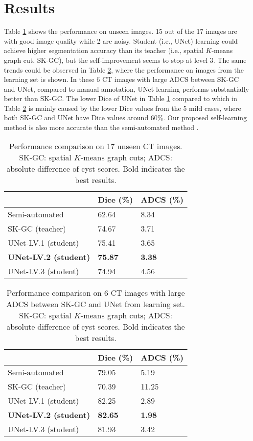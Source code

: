 \documentclass{article}
\begin{document}
\section{Results}
Table \ref{17slices} shows the performance on unseen images. 15 out of the 17 images are with good image quality while 2 are noisy. Student (i.e., UNet) learning could achieve higher segmentation accuracy than its teacher (i.e., spatial $K$-means graph cut, SK-GC), but the self-improvement seems to stop at level 3.  
The same trends could be observed in Table \ref{6slices}, where the performance on images from the learning set is shown. In these 6 CT images with large ADCS between SK-GC and UNet, compared to manual annotation, UNet learning performs substantially better than SK-GC. The lower Dice of UNet in Table \ref{17slices} compared to which in Table \ref{6slices} is mainly caused by the lower Dice values from the 5 mild cases, where both SK-GC and UNet have Dice values around 60\%. Our proposed self-learning method is also more accurate than the semi-automated method \cite{yao2014sustained}.

\begin{table}[!t] 
\centering
\caption{Performance comparison on 17 unseen CT images. SK-GC: spatial $K$-means graph cuts; ADCS: absolute difference of cyst scores. Bold indicates the best results.
}
\label{17slices}
\begin{tabular}{p{3cm}p{2.2cm}p{2.2cm}}
\hline
 & Dice (\%) & ADCS (\%)\\
\hline
Semi-automated \cite{yao2014sustained} & 62.64 & 8.34 \\
SK-GC (teacher) & 74.67 & 3.71 \\
UNet-LV.1 (student) & 75.41 & 3.65 \\
\textbf{UNet-LV.2 (student)} & \textbf{75.87} & \textbf{3.38} \\
UNet-LV.3 (student) & 74.94 & 4.56 \\
\hline
\end{tabular}
\end{table}


\begin{table}[!t] 
\centering
\caption{Performance comparison on 6 CT images with large ADCS between SK-GC and UNet from learning set. SK-GC: spatial $K$-means graph cuts; ADCS: absolute difference of cyst scores. Bold indicates the best results.
}
\label{6slices}
\begin{tabular}{p{3cm}p{2.2cm}p{2.2cm}}
\hline
 & Dice (\%) & ADCS (\%)\\
\hline
Semi-automated \cite{yao2014sustained} & 79.05 & 5.19 \\
SK-GC (teacher) & 70.39 & 11.25 \\
UNet-LV.1 (student) & 82.25 & 2.89 \\
\textbf{UNet-LV.2 (student)} & \textbf{82.65} & \textbf{1.98} \\
UNet-LV.3 (student) & 81.93 & 3.42 \\
\hline
\end{tabular}
\end{table}
\end{document}
